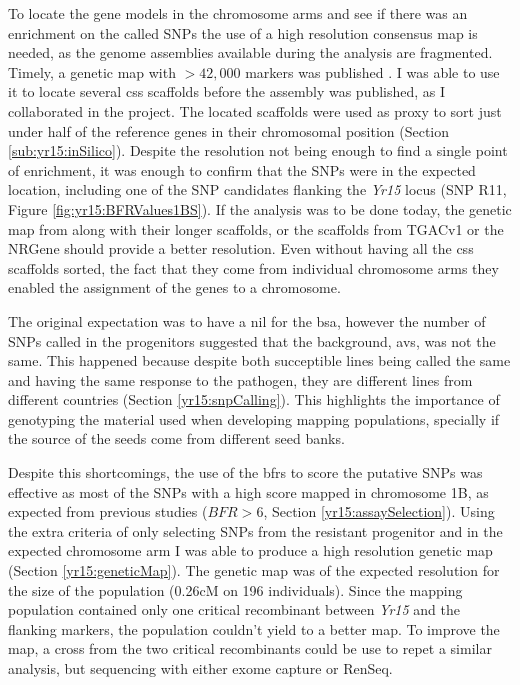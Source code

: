 To locate the gene models in the chromosome arms and see if there was an enrichment on the called SNPs the use of a high resolution consensus map is needed, as the genome assemblies available during the analysis are fragmented. 
Timely, a genetic map with $>42,000$ markers was published \citep{Wang2014}. 
I was able to use it to locate several \acrshort{css} scaffolds before the assembly was published, as I collaborated in the project. 
The located scaffolds were used as proxy to sort just under half of the reference genes in their chromosomal position (Section \ref{sub:yr15:inSilico}). 
Despite the resolution not being enough to find a single point of enrichment, it was enough to confirm that the SNPs were in the expected location, including one of the SNP candidates flanking the \textit{Yr15} locus (SNP R11, Figure \ref{fig:yr15:BFRValues1BS}).  
If the analysis was to be done today, the genetic map from \citet{Chapman2015} along with their longer scaffolds, or the scaffolds from TGACv1 or the NRGene should provide a better resolution. 
Even without having all the \acrshort{css} scaffolds sorted, the fact that they come from individual chromosome arms they enabled the assignment of the genes to a chromosome. 

The original expectation was to have a \gls{nil} for the \acrshort{bsa}, however the number of SNPs called in the progenitors suggested that the background, \acrlong{avs}, was not the same.  
This happened because despite both succeptible lines being called the same and having the same response to the pathogen, they are different lines from different countries (Section \ref{yr15:snpCalling}). 
This highlights the importance of genotyping the material used when developing mapping populations, specially if the source of the seeds come from different seed banks. 

Despite this shortcomings, the use of the \glspl{bfr} to score the putative SNPs was effective as most of the SNPs with a high score  mapped in chromosome 1B, as expected from previous studies ($BFR>6$, Section \ref{yr15:assaySelection}).
Using the extra criteria of only selecting SNPs from the resistant progenitor and in the expected chromosome arm I was able to produce a high resolution genetic map (Section \ref{yr15:geneticMap}). 
The genetic map was of the expected resolution for the size of the population (0.26cM on 196 individuals).
Since the mapping population contained only one critical recombinant between \textit{Yr15} and the flanking markers, the population couldn't yield to a better map. 
To improve the map, a cross from the two critical recombinants could be use to repet a similar analysis, but sequencing with either exome capture or RenSeq. 

